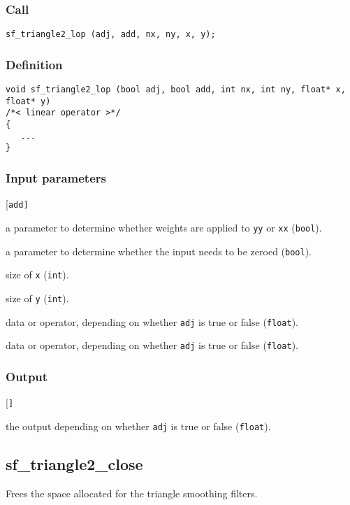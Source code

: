 \subsubsection*{Call}
\begin{verbatim}sf_triangle2_lop (adj, add, nx, ny, x, y);\end{verbatim}

\subsubsection*{Definition}
\begin{verbatim}
void sf_triangle2_lop (bool adj, bool add, int nx, int ny, float* x, float* y)
/*< linear operator >*/
{
   ...
}
\end{verbatim}

\subsubsection*{Input parameters}
\begin{desclist}{\tt }{\quad}[\tt add]
   \setlength\itemsep{0pt}
   \item[adj] a parameter to determine whether weights are applied to \texttt{yy} or \texttt{xx} (\texttt{bool}). 
   \item[add] a parameter to determine whether the input needs to be zeroed (\texttt{bool}).
   \item[nx]  size of \texttt{x} (\texttt{int}). 
   \item[ny]  size of \texttt{y} (\texttt{int}).
   \item[x]   data or operator, depending on whether \texttt{adj} is true or false (\texttt{float}).
   \item[y]   data or operator, depending on whether \texttt{adj} is true or false (\texttt{float}).
\end{desclist}

\subsubsection*{Output}
\begin{desclist}{\tt }{\quad}[\tt ]
   \setlength\itemsep{0pt}
   \item[\texttt{x} or \texttt{y}] the output depending on whether \texttt{adj} is true or false (\texttt{float}).
\end{desclist}




\subsection{{sf\_triangle2\_close}}
Frees the space allocated for the triangle smoothing filters.


